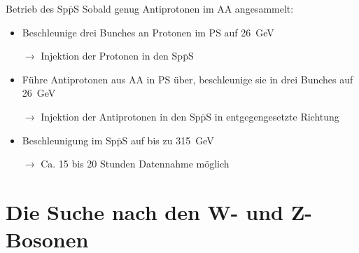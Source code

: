 \documentclass[aspectratio=1610, professionalfonts, 10pt]{beamer}
\begin{document}
\begin{frame}{Betrieb des Sp$\overline{\text{p}}$S}
				Sobald genug Antiprotonen im AA angesammelt:
				\begin{itemize}
					\setlength\itemsep{0.5em}
					\item Beschleunige drei Bunches an Protonen im PS auf \SI{26}{\giga\electronvolt}
					\item[$\rightarrow$] Injektion der Protonen in den Sp$\overline{\text{p}}$S
					\item Führe Antiprotonen aus AA in PS über, beschleunige sie in drei Bunches auf \SI{26}{\giga\electronvolt}
					\item[$\rightarrow$] Injektion der Antiprotonen in den Sp$\overline{\text{p}}$S in entgegengesetzte Richtung
					\item Beschleunigung im Sp$\overline{\text{p}}$S auf bis zu \SI{315}{\giga\electronvolt}
					\item[$\rightarrow$] Ca. 15 bis 20 Stunden Datennahme möglich
				\end{itemize}

\end{frame}

\section{Die Suche nach den W- und Z-Bosonen}
\end{document}
